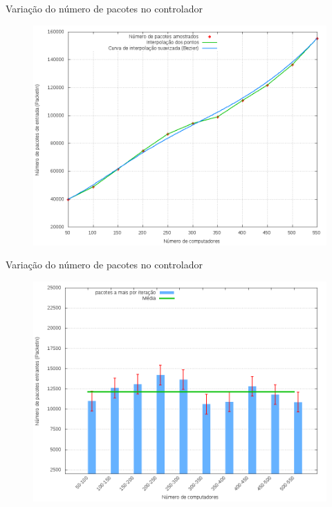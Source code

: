 \begin{frame}{Variação do número de pacotes no controlador}

    \begin{figure}[!htb]
        \centering
        \includegraphics[scale=.35]{images/packets-in}
    \end{figure}
\end{frame}


\begin{frame}{Variação do número de pacotes no controlador}

    \begin{figure}[!htb]
        \centering
        \includegraphics[scale=.35]{images/packets-in-stats}
    \end{figure}
\end{frame}


